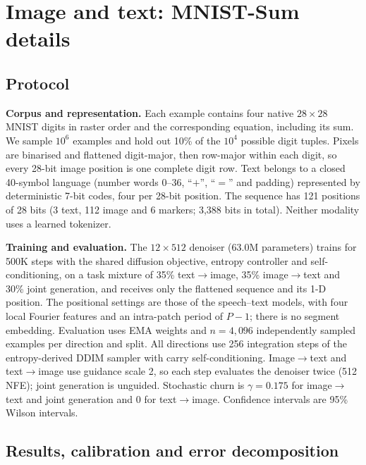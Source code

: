 \section{Image and text: MNIST-Sum details}
\label{app:image}

\subsection{Protocol}
\label{app:image:mnist}

\textbf{Corpus and representation.} Each example contains four native $28{\times}28$ MNIST digits
in raster order and the corresponding equation, including its sum. We sample $10^6$ examples and
hold out 10\% of the $10^4$ possible digit tuples. Pixels are binarised and flattened digit-major,
then row-major within each digit, so every 28-bit image position is one complete digit row. Text
belongs to a closed 40-symbol language (number words 0--36, ``$+$'', ``$=$'' and padding)
represented by deterministic 7-bit codes, four per 28-bit position. The sequence has 121
positions of 28 bits (3 text, 112 image and 6 markers; 3,388 bits in total). Neither modality uses a learned tokenizer.

\textbf{Training and evaluation.} The $12{\times}512$ denoiser (63.0M parameters) trains for 500K
steps with the shared diffusion objective, entropy controller and self-conditioning, on a task
mixture of 35\% text$\rightarrow$image, 35\% image$\rightarrow$text and 30\% joint generation, and receives
only the flattened sequence and its 1-D position. The positional settings
are those of the speech--text models, with four local Fourier features and an intra-patch period
of $P-1$; there is no segment embedding.
Evaluation uses EMA weights and $n{=}4{,}096$ independently sampled examples per direction and
split. All directions use 256 integration steps of the entropy-derived DDIM sampler with carry
self-conditioning. Image$\rightarrow$text and text$\rightarrow$image use guidance scale 2, so each step evaluates
the denoiser twice (512 NFE); joint generation is unguided. Stochastic churn is $\gamma{=}0.175$ for
image$\rightarrow$text and joint generation and 0 for text$\rightarrow$image. Confidence intervals are 95\% Wilson
intervals.

\subsection{Results, calibration and error decomposition}


